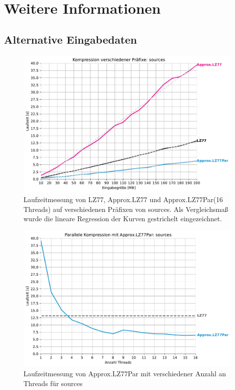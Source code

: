 \chapter{Weitere Informationen}
\section{Alternative Eingabedaten}
\begin{figure}
    \centering
    \caption{Laufzeitmessung von LZ77, Approx.LZ77 und Approx.LZ77Par(16 Threads) auf verschiedenen Präfixen von sources. Als Vergleichsmaß wurde 
    die lineare Regression der Kurven gestrichelt eingezeichnet.}
    \includegraphics[scale=0.6]{Images/progressive_sources.pdf}
\end{figure}

\begin{figure}
    \centering
    \caption{Laufzeitmessung von Approx.LZ77Par mit verschiedener Anzahl an Threads für sources}
    \includegraphics[scale=0.6]{Images/progressive_speedup_sources.pdf}
\end{figure}

